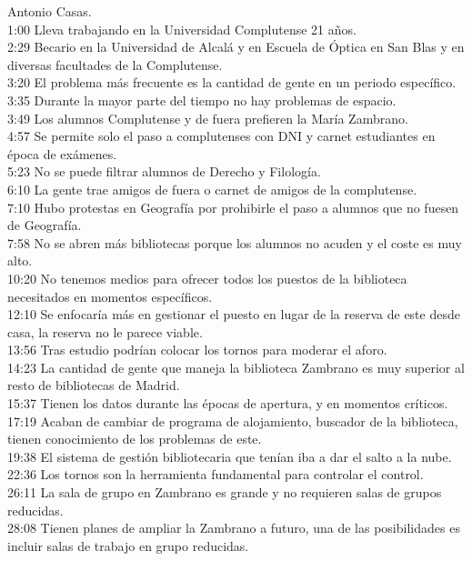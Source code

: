 \documentclass[12pt]{article}
\begin{document}
Antonio Casas.\\
1:00 Lleva trabajando en la Universidad Complutense 21 años.\\
2:29 Becario en la Universidad de Alcalá y en Escuela de Óptica en San Blas y en diversas facultades de la Complutense.\\
3:20 El problema más frecuente es la cantidad de gente en un periodo específico.\\
3:35 Durante la mayor parte del tiempo no hay problemas de espacio.\\
3:49 Los alumnos Complutense y de fuera prefieren la María Zambrano.\\
4:57 Se permite solo el paso a complutenses con DNI y carnet estudiantes en época de exámenes.\\
5:23 No se puede filtrar alumnos de Derecho y Filología.\\
6:10 La gente trae amigos de fuera o carnet de amigos de la complutense.\\
7:10 Hubo protestas en Geografía por prohibirle el paso a alumnos que no fuesen de Geografía.\\
7:58 No se abren más bibliotecas porque los alumnos no acuden y el coste es muy alto.\\
10:20 No tenemos medios para ofrecer todos los puestos de la biblioteca necesitados en momentos específicos.\\
12:10 Se enfocaría más en gestionar el puesto en lugar de la reserva de este desde casa, la reserva no le parece viable.\\
13:56 Tras estudio podrían colocar los tornos para moderar el aforo.\\
14:23 La cantidad de gente que maneja la biblioteca Zambrano es muy superior al resto de bibliotecas de Madrid.\\
15:37 Tienen los datos durante las épocas de apertura, y en momentos críticos.\\
17:19 Acaban de cambiar de programa de alojamiento, buscador de la biblioteca, tienen conocimiento de los problemas de este.\\
19:38 El sistema de gestión bibliotecaria que tenían iba a dar el salto a la nube.\\
22:36 Los tornos son la herramienta fundamental para controlar el control.\\
26:11 La sala de grupo en Zambrano es grande y no requieren salas de grupos reducidas.\\
28:08 Tienen planes de ampliar la Zambrano a futuro, una de las posibilidades es incluir salas de trabajo en grupo reducidas.\\
\end{document}
